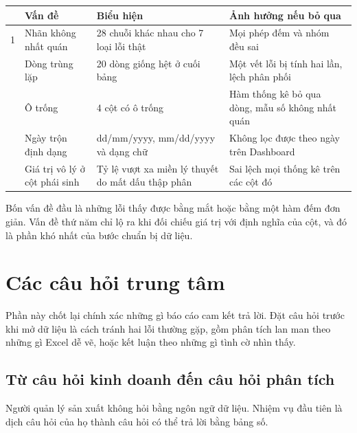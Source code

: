\documentclass[12pt]{article}
\begin{document}
\begin{center}
\small
\begin{tabular}{@{}p{0.5cm} p{4.2cm} p{5.9cm} p{5.1cm}@{}}
\toprule
 & \textbf{Vấn đề} & \textbf{Biểu hiện} & \textbf{Ảnh hưởng nếu bỏ qua} \\
\midrule
1 & Nhãn không nhất quán & 28 chuỗi khác nhau cho 7 loại lỗi thật & Mọi phép đếm và nhóm đều sai \\
\addlinespace[3pt]
2 & Dòng trùng lặp & 20 dòng giống hệt ở cuối bảng & Một vết lỗi bị tính hai lần, lệch phân phối \\
\addlinespace[3pt]
3 & Ô trống & 4 cột có ô trống & Hàm thống kê bỏ qua dòng, mẫu số không nhất quán \\
\addlinespace[3pt]
4 & Ngày trộn định dạng & dd/mm/yyyy, mm/dd/yyyy và dạng chữ & Không lọc được theo ngày trên Dashboard \\
\addlinespace[3pt]
5 & Giá trị vô lý ở cột phái sinh & Tỷ lệ vượt xa miền lý thuyết do mất dấu thập phân & Sai lệch mọi thống kê trên các cột đó \\
\bottomrule
\end{tabular}
\end{center}

\noindent Bốn vấn đề đầu là những lỗi thấy được bằng mắt hoặc bằng một hàm đếm đơn giản. Vấn đề thứ năm chỉ lộ ra khi đối chiếu giá trị với định nghĩa của cột, và đó là phần khó nhất của bước chuẩn bị dữ liệu.

\newpage
\section{Các câu hỏi trung tâm}

Phần này chốt lại chính xác những gì báo cáo cam kết trả lời. Đặt câu hỏi trước khi mở dữ liệu là cách tránh hai lỗi thường gặp, gồm phân tích lan man theo những gì Excel dễ vẽ, hoặc kết luận theo những gì tình cờ nhìn thấy.

\subsection{Từ câu hỏi kinh doanh đến câu hỏi phân tích}

Người quản lý sản xuất không hỏi bằng ngôn ngữ dữ liệu. Nhiệm vụ đầu tiên là dịch câu hỏi của họ thành câu hỏi có thể trả lời bằng bảng số.
\end{document}
